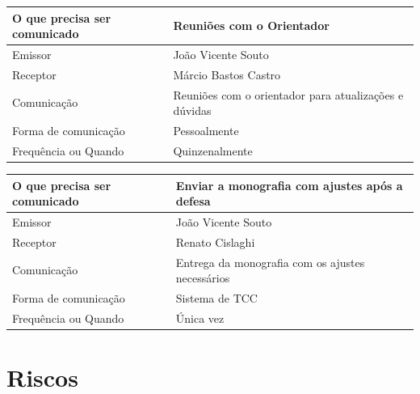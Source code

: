 \documentclass[
	12pt,				%
	openright,			%
	twoside,			%
	a4paper,			%
	english,			%
	brazil,				%
	]{abntex2}
\begin{document}
\begin{center}
\begin{tabular}{|l|p{9cm}|}
\hline
    O que precisa ser comunicado & Reuniões com o Orientador \\ \hline
    Emissor & João Vicente Souto \\ \hline
    Receptor & Márcio Bastos Castro \\ \hline
    Comunicação & Reuniões com o orientador para atualizações e dúvidas \\ \hline
    Forma de comunicação & Pessoalmente \\ \hline
    Frequência ou Quando & Quinzenalmente \\ \hline
\end{tabular}
\end{center}

\begin{center}
\begin{tabular}{|l|p{9cm}|}
\hline
    O que precisa ser comunicado & Enviar a monografia com ajustes após a defesa \\ \hline
    Emissor & João Vicente Souto \\ \hline
    Receptor & Renato Cislaghi \\ \hline
    Comunicação & Entrega da monografia com os ajustes necessários \\ \hline
    Forma de comunicação & Sistema de TCC \\ \hline
    Frequência ou Quando & Única vez \\ \hline
\end{tabular}
\end{center}

\newpage
\section{Riscos}
\end{document}
